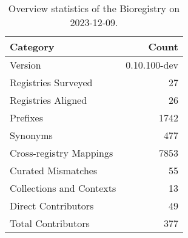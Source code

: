 \begin{table}
\caption{Overview statistics of the Bioregistry on 2023-12-09.}
\label{tab:bioregistry-summary}
\begin{tabular}{lr}
\toprule
Category & Count \\
\midrule
Version & 0.10.100-dev \\
Registries Surveyed & 27 \\
Registries Aligned & 26 \\
Prefixes & 1742 \\
Synonyms & 477 \\
Cross-registry Mappings & 7853 \\
Curated Mismatches & 55 \\
Collections and Contexts & 13 \\
Direct Contributors & 49 \\
Total Contributors & 377 \\
\bottomrule
\end{tabular}
\end{table}
